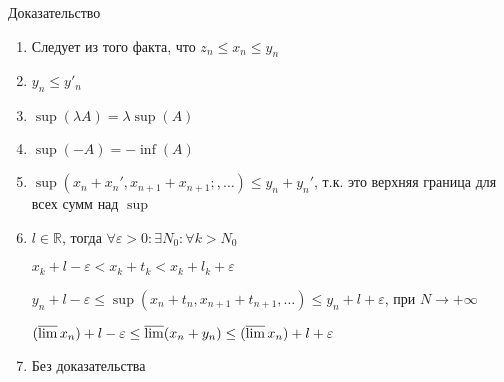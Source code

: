 \documentclass[../main.tex]{subfiles}
\begin{document}
$$$$
Доказательство
$$$$

            \begin{enumerate}
            
                \item Следует из того факта, что $z_n \leq x_n \leq y_n$
                
                \item $y_n \leq y'_n$
                
                \item $\sup(\lambda A) = \lambda \sup(A)$
                
                \item $\sup(-A) = -\inf(A)$
                
                \item $\sup(x_n + x_n', x_{n + 1} + x_{n + 1};, \ldots) \leq y_n + y_n'$, т.к. это верхняя граница для всех сумм над $\sup$
                
                \item $l \in \mathbb{R}$, тогда $\forall \varepsilon > 0 : \exists N_0: \forall k > N_0$
                
                    $x_k + l - \varepsilon < x_k + t_k < x_k + l_k + \varepsilon$
                    
                    $y_n + l - \varepsilon \leq \sup(x_n + t_n, x_{n + 1} + t_{n + 1}, \ldots) \leq y_n + l + \varepsilon$, при $N \rightarrow +\infty$
                    
                    $(\varlimsup x_n) + l - \varepsilon \leq \varlimsup (x_n + y_n) \leq (\varlimsup x_n) + l + \varepsilon$
                    
                \item Без доказательства
                
            \end{enumerate}
\newpage
\end{document}
